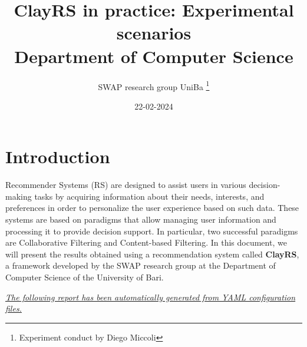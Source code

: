 \documentclass[11pt]{article}
\title{\textbf{ ClayRS in practice: Experimental scenarios }\\ [1cm] Department of Computer Science}
\author{ SWAP research group UniBa \thanks{Experiment conduct by Diego Miccoli}}
\date{22-02-2024}
\begin{document}
\maketitle

\section{Introduction}\label{sec:intro}
Recommender Systems (RS) are designed to assist users in various decision-making tasks by acquiring
information about their needs, interests, and preferences in order to personalize the user experience
based on such data.
These systems are based on paradigms that allow managing user information and processing
it to provide decision support.
In particular, two successful paradigms are Collaborative Filtering and Content-based Filtering.
In this document, we will present the results obtained using a recommendation system called \textbf{ClayRS},
a framework developed by the SWAP research group at the Department of Computer Science of the University of Bari.\\
\hfill\break

\textit{\ul{The following report has been automatically generated from YAML configuration files.}}

\hfill\break
\end{document}

